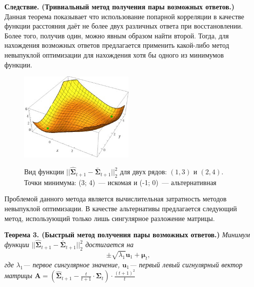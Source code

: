 \documentclass{article}
\begin{document}
\textbf{Следствие. (Тривиальный метод получения пары возможных ответов.)} Данная теорема показывает что использование попарной корреляции в качестве функции расстояния даёт не более двух различных ответа при восстановлении. Более того, получив один, можно явным образом найти второй. Тогда, для нахождения возможных ответов предлагается применить какой-либо метод невыпуклой оптимизации для нахождения хотя бы одного из минимумов функции.

\begin{figure}[H]
	\centering
	\begin{center}
		\includegraphics[width=0.5\textwidth]{CorrelationError}
		\label{fig:fig5}
	\end{center}
	\caption{Вид функции $||\hat{\mathbf{\Sigma}}_{t+1} - \bar{\mathbf{\Sigma}}_{t+1}||_2^2$ для двух рядов: $(1, 3)$ и $(2, 4)$. Точки минимума: (3; 4)~--- искомая и (-1; 0)~--- альтернативная}
\end{figure}


Проблемой данного метода является вычислительная затратность методов невыпуклой оптимизации. В качестве альтернативы предлагается следующий метод, использующий только лишь сингулярное разложение матрицы.

\textbf{Теорема 3. (Быстрый метод получения пары возможных ответов.)} \textit{Минимум функции $||\hat{\mathbf{\Sigma}}_{t+1} - \bar{\mathbf{\Sigma}}_{t+1}||_2^2$ достигается на \[\pm\sqrt{\lambda_1} \mathbf{u}_1 + \boldsymbol{\mu}_t,\] где $\lambda_1$--- первое сингулярное значение, $\mathbf{u}_1$--- первый левый сигнулярный вектор матрицы $\mathbf{A}=\left(\hat{\mathbf{\Sigma}}_{t+1} - \frac{t}{t+1} \cdot \mathbf{\Sigma}_t \right) \cdot \frac{(t+1)^2}{t}$}
\end{document}
